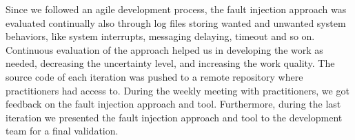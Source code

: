 
Since we followed an agile development process, the fault injection approach was evaluated continually also through log files storing wanted and unwanted system behaviors, like system interrupts, messaging delaying, timeout and so on. Continuous evaluation of the approach helped us in developing the work as needed, decreasing the uncertainty level, and increasing the work quality. The source code of each iteration was pushed to a remote repository where practitioners had access to. During the weekly meeting with practitioners, we got feedback on the fault injection approach and tool. Furthermore, during the last iteration we presented the fault injection approach and tool to the development team for a final validation.


%


